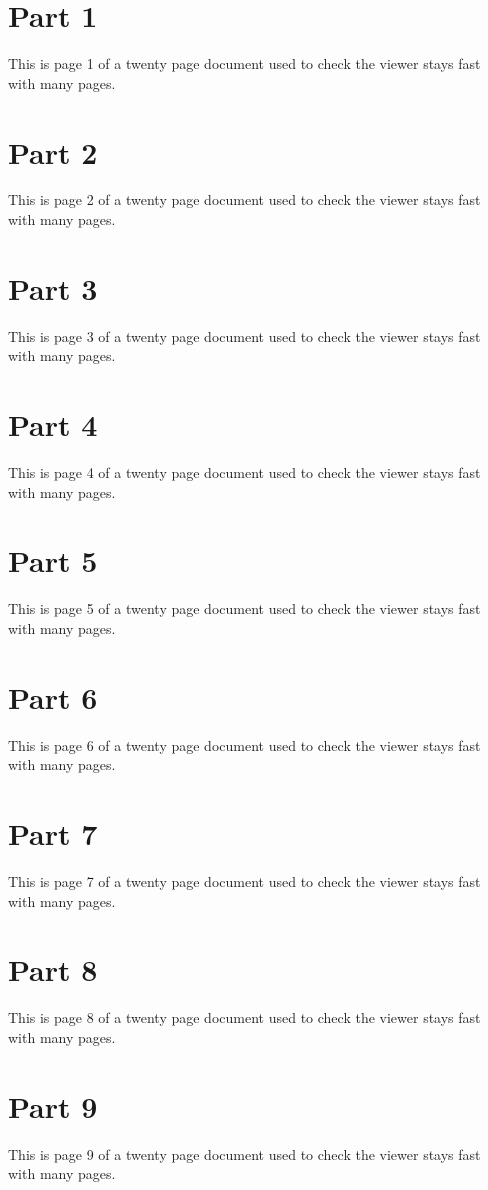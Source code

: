 \documentclass{article}
\begin{document}
\section{Part 1}
This is page 1 of a twenty page document used to check the viewer stays fast with many pages.

\newpage
\section{Part 2}
This is page 2 of a twenty page document used to check the viewer stays fast with many pages.

\newpage
\section{Part 3}
This is page 3 of a twenty page document used to check the viewer stays fast with many pages.

\newpage
\section{Part 4}
This is page 4 of a twenty page document used to check the viewer stays fast with many pages.

\newpage
\section{Part 5}
This is page 5 of a twenty page document used to check the viewer stays fast with many pages.

\newpage
\section{Part 6}
This is page 6 of a twenty page document used to check the viewer stays fast with many pages.

\newpage
\section{Part 7}
This is page 7 of a twenty page document used to check the viewer stays fast with many pages.

\newpage
\section{Part 8}
This is page 8 of a twenty page document used to check the viewer stays fast with many pages.

\newpage
\section{Part 9}
This is page 9 of a twenty page document used to check the viewer stays fast with many pages.
\end{document}
